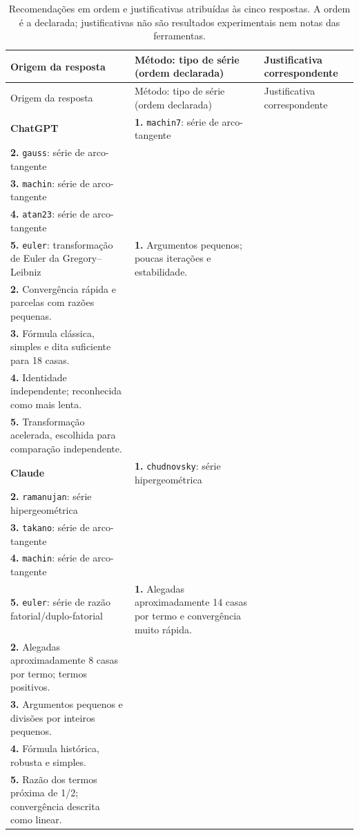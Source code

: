\begingroup
\small
\setlength{\tabcolsep}{3pt}
\renewcommand{\arraystretch}{1.12}
\begin{longtable}{@{}p{1.45cm}p{5.15cm}p{8.15cm}@{}}
\caption{Recomendações em ordem e justificativas atribuídas às cinco respostas. A ordem é a declarada; justificativas não são resultados experimentais nem notas das ferramentas.}\label{tab:recommendations}\\
\toprule
Origem da resposta & Método: tipo de série (ordem declarada) & Justificativa correspondente\\
\midrule
\endfirsthead
\toprule
Origem da resposta & Método: tipo de série (ordem declarada) & Justificativa correspondente\\
\midrule
\endhead
\textbf{ChatGPT} & \textbf{1.} \texttt{machin7}: série de arco-tangente\\[-1pt]\textbf{2.} \texttt{gauss}: série de arco-tangente\\[-1pt]\textbf{3.} \texttt{machin}: série de arco-tangente\\[-1pt]\textbf{4.} \texttt{atan23}: série de arco-tangente\\[-1pt]\textbf{5.} \texttt{euler}: transformação de Euler da Gregory--Leibniz & \textbf{1.} Argumentos pequenos; poucas iterações e estabilidade.\\[-1pt]\textbf{2.} Convergência rápida e parcelas com razões pequenas.\\[-1pt]\textbf{3.} Fórmula clássica, simples e dita suficiente para 18 casas.\\[-1pt]\textbf{4.} Identidade independente; reconhecida como mais lenta.\\[-1pt]\textbf{5.} Transformação acelerada, escolhida para comparação independente.\\
\addlinespace[4pt]
\textbf{Claude} & \textbf{1.} \texttt{chudnovsky}: série hipergeométrica\\[-1pt]\textbf{2.} \texttt{ramanujan}: série hipergeométrica\\[-1pt]\textbf{3.} \texttt{takano}: série de arco-tangente\\[-1pt]\textbf{4.} \texttt{machin}: série de arco-tangente\\[-1pt]\textbf{5.} \texttt{euler}: série de razão fatorial/duplo-fatorial & \textbf{1.} Alegadas aproximadamente 14 casas por termo e convergência muito rápida.\\[-1pt]\textbf{2.} Alegadas aproximadamente 8 casas por termo; termos positivos.\\[-1pt]\textbf{3.} Argumentos pequenos e divisões por inteiros pequenos.\\[-1pt]\textbf{4.} Fórmula histórica, robusta e simples.\\[-1pt]\textbf{5.} Razão dos termos próxima de 1/2; convergência descrita como linear.\\

\end{longtable}
